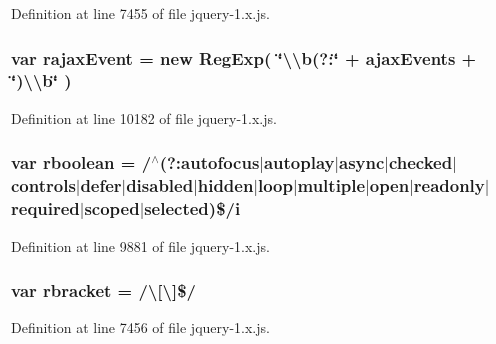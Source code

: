 Definition at line 7455 of file jquery-\/1.\+x.\+js.

\subsubsection[{\texorpdfstring{rajax\+Event}{rajaxEvent}}]{\setlength{\rightskip}{0pt plus 5cm}var rajax\+Event = new Reg\+Exp( \char`\"{}\textbackslash{}\textbackslash{}b(?\+:\char`\"{} + ajax\+Events + \char`\"{})\textbackslash{}\textbackslash{}b\char`\"{} )}\hypertarget{jquery-1_8x_8js_a9c1dd76dd7323bf3aad84b78ea51b475}{}\label{jquery-1_8x_8js_a9c1dd76dd7323bf3aad84b78ea51b475}


Definition at line 10182 of file jquery-\/1.\+x.\+js.

\subsubsection[{\texorpdfstring{rboolean}{rboolean}}]{\setlength{\rightskip}{0pt plus 5cm}var rboolean = /$^\wedge$(?\+:autofocus$\vert$autoplay$\vert$async$\vert$checked$\vert$controls$\vert$defer$\vert$disabled$\vert${\bf hidden}$\vert$loop$\vert$multiple$\vert$open$\vert$readonly$\vert$required$\vert$scoped$\vert$selected)\$/{\bf i}}\hypertarget{jquery-1_8x_8js_a1a18c2fa719df5a1ec431335692f7c7f}{}\label{jquery-1_8x_8js_a1a18c2fa719df5a1ec431335692f7c7f}


Definition at line 9881 of file jquery-\/1.\+x.\+js.

\subsubsection[{\texorpdfstring{rbracket}{rbracket}}]{\setlength{\rightskip}{0pt plus 5cm}var rbracket = /\textbackslash{}\mbox{[}\textbackslash{}\mbox{]}\$/}\hypertarget{jquery-1_8x_8js_a07117e28ee58d2d2664cfbaf741e10c1}{}\label{jquery-1_8x_8js_a07117e28ee58d2d2664cfbaf741e10c1}


Definition at line 7456 of file jquery-\/1.\+x.\+js.

